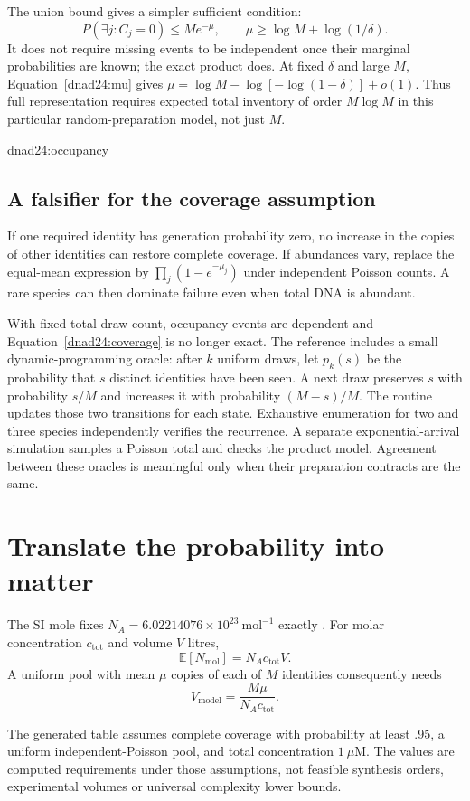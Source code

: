 The union bound gives a simpler sufficient condition:
\[
P(\exists j:C_j=0)\le M e^{-\mu},
\qquad \mu\ge\log M+\log(1/\delta).
\]
It does not require missing events to be independent once their marginal
probabilities are known; the exact product does. At fixed $\delta$ and large $M$,
Equation~\ref{dnad24:mu} gives
$\mu=\log M-\log[-\log(1-\delta)]+o(1)$.
Thus full representation requires expected total inventory of order
$M\log M$ in this particular random-preparation model, not just $M$.

{dnad24:occupancy}

\subsection{A falsifier for the coverage assumption}
If one required identity has generation probability zero, no increase in the
copies of other identities can restore complete coverage. If abundances vary,
replace the equal-mean expression by
$\prod_j(1-e^{-\mu_j})$ under independent Poisson counts. A rare species can then
dominate failure even when total DNA is abundant.

With fixed total draw count, occupancy events are dependent and
Equation~\ref{dnad24:coverage} is no longer exact. The reference includes a small
dynamic-programming oracle: after $k$ uniform draws, let $p_k(s)$ be the probability
that $s$ distinct identities have been seen. A next draw preserves $s$ with
probability $s/M$ and increases it with probability $(M-s)/M$.
The routine updates those two transitions for each state.
Exhaustive enumeration for two and three species independently verifies the
recurrence. A separate exponential-arrival simulation samples a Poisson total and
checks the product model. Agreement between these oracles is meaningful only when
their preparation contracts are the same.

\section{Translate the probability into matter}
The SI mole fixes $N_A=6.02214076\times10^{23}\ \mathrm{mol}^{-1}$ exactly
\cite{dnad24:si}. For molar concentration $c_{\mathrm{tot}}$ and volume $V$ litres,
\[
\mathbb E[N_{\mathrm{mol}}]=N_Ac_{\mathrm{tot}}V.
\]
A uniform pool with mean $\mu$ copies of each of $M$ identities consequently needs
\begin{equation}
V_{\mathrm{model}}=\frac{M\mu}{N_Ac_{\mathrm{tot}}}.
\label{dnad24:volume}
\end{equation}
\begin{center}\small\end{center}
The generated table assumes complete coverage with probability at least .95,
a uniform independent-Poisson pool, and total concentration $1\ \mu\mathrm M$.
The values are computed requirements under those assumptions, not feasible
synthesis orders, experimental volumes or universal complexity lower bounds.

